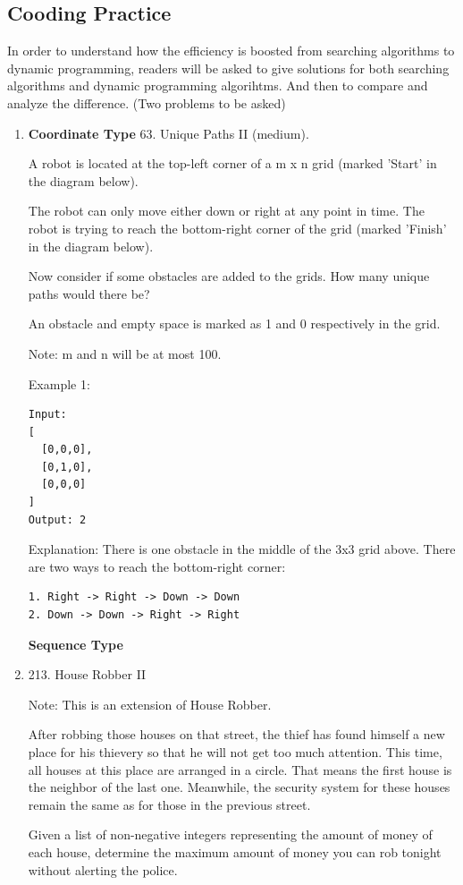 \documentclass[../main.tex]{subfiles}
\begin{document}
\subsection{Cooding Practice}
In order to understand how the efficiency is boosted from searching algorithms to dynamic programming, readers will be asked to give solutions for both searching algorithms and dynamic programming algorihtms. And then to compare and analyze the difference. (Two problems to be asked) 
\begin{enumerate}


\item \textbf{Coordinate Type} 63. Unique Paths II (medium).

A robot is located at the top-left corner of a m x n grid (marked 'Start' in the diagram below).

The robot can only move either down or right at any point in time. The robot is trying to reach the bottom-right corner of the grid (marked 'Finish' in the diagram below).

Now consider if some obstacles are added to the grids. How many unique paths would there be?

An obstacle and empty space is marked as 1 and 0 respectively in the grid.

Note: m and n will be at most 100.

Example 1:
\begin{lstlisting}
Input:
[
  [0,0,0],
  [0,1,0],
  [0,0,0]
]
Output: 2
\end{lstlisting}
Explanation:
There is one obstacle in the middle of the 3x3 grid above.
There are two ways to reach the bottom-right corner:
\begin{lstlisting}
1. Right -> Right -> Down -> Down
2. Down -> Down -> Right -> Right
\end{lstlisting}

\textbf{Sequence Type}

\item 213. House Robber II

Note: This is an extension of House Robber.

After robbing those houses on that street, the thief has found himself a new place for his thievery so that he will not get too much attention. This time, all houses at this place are arranged in a circle. That means the first house is the neighbor of the last one. Meanwhile, the security system for these houses remain the same as for those in the previous street.

Given a list of non-negative integers representing the amount of money of each house, determine the maximum amount of money you can rob tonight without alerting the police.


\end{enumerate}
\end{document}
